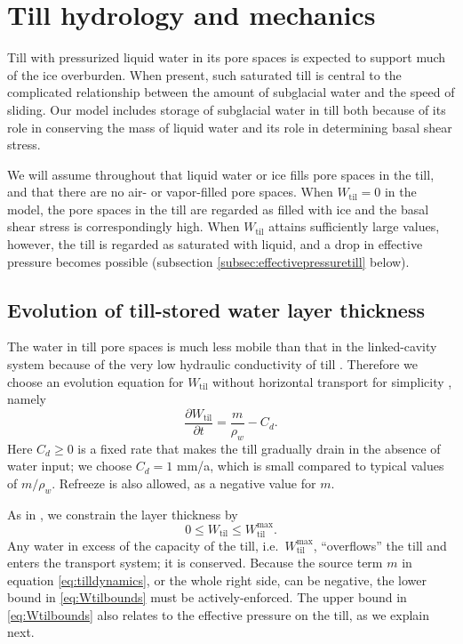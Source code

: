 \documentclass[gmd]{copernicus}   %
\newcommand{\text}{\textrm}
\newcommand{\Wtil}{W_{\text{til}}}
\newcommand{\Wtilmax}{W_{\text{til}}^{\text{max}}}
\begin{document}
\section{Till hydrology and mechanics} \label{sec:tillmechanics}

Till with pressurized liquid water in its pore spaces is expected to support much of the ice overburden.  When present, such saturated till is central to the complicated relationship between the amount of subglacial water and the speed of sliding.  Our model includes storage of subglacial water in till both because of its role in conserving the mass of liquid water and its role in determining basal shear stress.

We will assume throughout that liquid water or ice fills pore spaces in the till, and that there are no air- or vapor-filled pore spaces.  When $\Wtil=0$ in the model, the pore spaces in the till are regarded as filled with ice and the basal shear stress is correspondingly high.  When $\Wtil$ attains sufficiently large values, however, the till is regarded as saturated with liquid, and a drop in effective pressure becomes possible (subsection \ref{subsec:effectivepressuretill} below).

\subsection{Evolution of till-stored water layer thickness}  The water in till pore spaces is much less mobile than that in the linked-cavity system because of the very low hydraulic conductivity of till \citep{LingleBrown1987,TrufferEchelmeyerHarrison2001}.  Therefore we choose an evolution equation for $\Wtil$ without horizontal transport for simplicity \citep{BBssasliding,Tulaczyketal2000}, namely
\begin{equation}
\frac{\partial \Wtil}{\partial t} = \frac{m}{\rho_w} - C_d. \label{eq:tilldynamics}
\end{equation}
Here $C_d\ge 0$ is a fixed rate that makes the till gradually drain in the absence of water input; we choose $C_d=1$ mm/a, which is small compared to typical values of $m/\rho_w$.  Refreeze is also allowed, as a negative value for $m$.

As in \citep{BBssasliding}, we constrain the layer thickness by
\begin{equation}
0 \le \Wtil \le \Wtilmax.  \label{eq:Wtilbounds}
\end{equation}
Any water in excess of the capacity of the till, i.e.~$\Wtilmax$, ``overflows'' the till and enters the transport system; it is conserved.  Because the source term $m$ in equation \eqref{eq:tilldynamics}, or the whole right side, can be negative, the lower bound in \eqref{eq:Wtilbounds} must be actively-enforced.  The upper bound in \eqref{eq:Wtilbounds} also relates to the effective pressure on the till, as we explain next.
\end{document}
